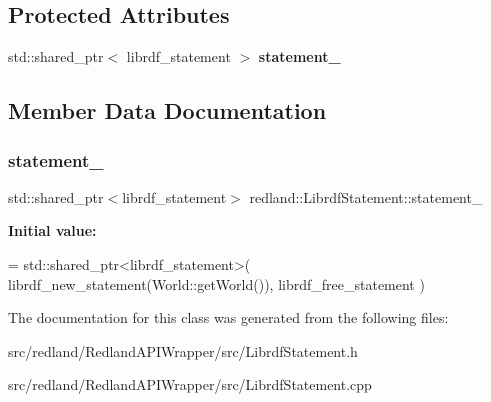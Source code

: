 \subsection*{Protected Attributes}
\begin{DoxyCompactItemize}
\item 
std\+::shared\+\_\+ptr$<$ librdf\+\_\+statement $>$ {\bfseries statement\+\_\+}
\end{DoxyCompactItemize}


\subsection{Member Data Documentation}
\mbox{\label{classredland_1_1LibrdfStatement_ab76c572a450a69c9932a6f8534d978d5}} 
\subsubsection{\texorpdfstring{statement\+\_\+}{statement\_}}
{\footnotesize\ttfamily std\+::shared\+\_\+ptr$<$librdf\+\_\+statement$>$ redland\+::\+Librdf\+Statement\+::statement\+\_\+\hspace{0.3cm}{\ttfamily [protected]}}

{\bfseries Initial value\+:}
\begin{DoxyCode}
= std::shared\_ptr<librdf\_statement>(
                librdf\_new\_statement(World::getWorld()),
                librdf\_free\_statement
        )
\end{DoxyCode}


The documentation for this class was generated from the following files\+:\begin{DoxyCompactItemize}
\item 
src/redland/\+Redland\+A\+P\+I\+Wrapper/src/Librdf\+Statement.\+h\item 
src/redland/\+Redland\+A\+P\+I\+Wrapper/src/Librdf\+Statement.\+cpp\end{DoxyCompactItemize}
